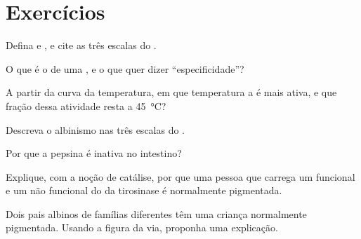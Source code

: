 \section{Exercícios}

\begin{exercise}[$\star$]\label{exo:g11:enzymes-and-phenotype:1}
Defina  e , e cite as três escalas do .
\end{exercise}

\begin{exercise}[$\star$]\label{exo:g11:enzymes-and-phenotype:2}
O que é o  de uma , e o que quer dizer ``especificidade''?
\end{exercise}

\begin{exercise}[$\star$]\label{exo:g11:enzymes-and-phenotype:3}
A partir da curva da temperatura, em que temperatura a  é mais
ativa, e que fração dessa atividade resta a \qty{45}{\celsius}?
\end{exercise}

\begin{exercise}[$\star$]\label{exo:g11:enzymes-and-phenotype:4}
Descreva o albinismo nas três escalas do .
\end{exercise}

\begin{exercise}[$\star$]\label{exo:g11:enzymes-and-phenotype:5}
Por que a pepsina é inativa no intestino?
\end{exercise}

\begin{exercise}[$\star\star$]\label{exo:g11:enzymes-and-phenotype:6}
Explique, com a noção de catálise, por que uma pessoa que carrega um
 funcional e um não funcional do  da tirosinase é normalmente
pigmentada.
\end{exercise}

\begin{exercise}[$\star\star$]\label{exo:g11:enzymes-and-phenotype:7}
Dois pais albinos de famílias diferentes têm uma criança normalmente
pigmentada. Usando a figura da via, proponha uma explicação.
\end{exercise}

